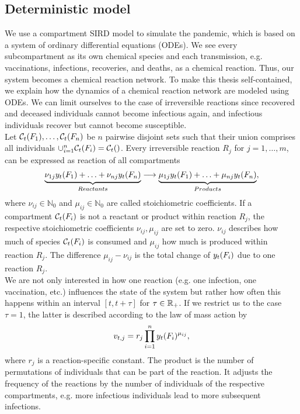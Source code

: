 \subsection{Deterministic model}
We use a compartment SIRD model to simulate the pandemic, which is based on a system of ordinary differential equations (ODEs). We see every subcompartment as its own chemical species and each transmission, e.g. vaccinations, infections, recoveries, and deaths, as a chemical reaction. Thus, our system becomes a chemical reaction network. To make this thesis self-contained, we explain how the dynamics of a chemical reaction network are modeled using ODEs. We can limit ourselves to the case of irreversible reactions since recovered and deceased individuals cannot become infectious again, and infectious individuals recover but cannot become susceptible. \\

Let $\mathcal{C}_t(F_1), \dots, \mathcal{C}_t(F_n)$ be $n$ pairwise disjoint sets such that their union comprises all individuals $\cup_{i=1}^n \mathcal{C}_t(F_i) = \mathcal{C}_t()$. Every irreversible reaction $R_j$ for $j = 1, \dots, m$, can be expressed as reaction of all compartments
\begin{align}
\underbrace{\nu_{1j} y_t(F_1) + \hdots + \nu_{nj} y_t(F_n)}_{Reactants} \longrightarrow \underbrace{\mu_{1j} y_t(F_1) + \hdots + \mu_{nj} y_t(F_n)}_{Products},
\end{align}
where $\nu_{ij} \in \mathbb{N}_0$ and $\mu_{ij} \in \mathbb{N}_0$ are called stoichiometric coefficients. If a compartment $\mathcal{C}_t(F_i)$ is not a reactant or product within reaction $R_j$, the respective stoichiometric coefficients $\nu_{ij}, \mu_{ij}$ are set to zero. $\nu_{ij}$ describes how much of species $\mathcal{C}_t(F_i)$ is consumed and $\mu_{ij}$ how much is produced within reaction $R_j$. The difference $\mu_{ij} - \nu_{ij}$ is the total change of $y_t(F_i)$ due to one reaction $R_j$.\\

We are not only interested in how one reaction (e.g. one infection, one vaccination, etc.) influences the state of the system but rather how often this happens within an interval $[t, t+\tau]$ for $\tau \in \mathbb{R}_+$. If we restrict us to the case $\tau = 1$, the latter is described according to the law of mass action by
\begin{align}
\label{eq:change_one_unit}
v_{t,j} = r_j  \prod_{i=1}^n y_t(F_i)^{\mu_{ij}},
\end{align}
where $r_j$ is a reaction-specific constant. The product is the number of permutations of individuals that can be part of the reaction. It adjusts the frequency of the reactions by the number of individuals of the respective compartments, e.g. more infectious individuals lead to more subsequent infections.

